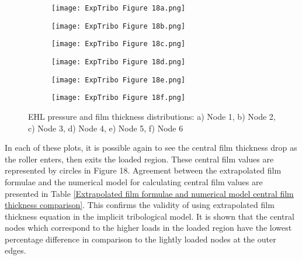 \begin{figure}
	\centering
	\begin{subfigure}[b]{0.49\textwidth}
		\centering
		\texttt{[image: ExpTribo Figure 18a.png]}
		\caption{}
		\label{NodeA}
	\end{subfigure}
	\hfill
	\begin{subfigure}[b]{0.49\textwidth}
		\centering
		\texttt{[image: ExpTribo Figure 18b.png]}
		\caption{}
		\label{NodeB}
	\end{subfigure}
	\hfill
	\begin{subfigure}[b]{0.49\textwidth}
		\centering
		\texttt{[image: ExpTribo Figure 18c.png]}
		\caption{}
		\label{NodeC}
	\end{subfigure}
	\hfill
	\begin{subfigure}[b]{0.49\textwidth}
		\centering
		\texttt{[image: ExpTribo Figure 18d.png]}
		\caption{}
		\label{NodeD}
	\end{subfigure}
	\hfill
	\begin{subfigure}[b]{0.49\textwidth}
		\centering
		\texttt{[image: ExpTribo Figure 18e.png]}
		\caption{}
		\label{NodeE}
	\end{subfigure}
	\hfill
	\begin{subfigure}[b]{0.49\textwidth}
		\centering
		\texttt{[image: ExpTribo Figure 18f.png]}
		\caption{}
		\label{NodeF}
	\end{subfigure}
	\caption{EHL pressure and film thickness distributions: a) Node 1, b) Node 2, c) Node 3, d) Node 4, e) Node 5, f) Node 6}
	\label{EHL pressure and film thickness distributions}
\end{figure}

In each of these plots, it is possible again to see the central film thickness drop as the roller enters, then exits the loaded region. These central film values are represented by circles in Figure 18. Agreement between the extrapolated film formulae and the numerical model for calculating central film values are presented in Table \ref{Extrapolated film formulae and numerical model central film thickness comparison}. This confirms the validity of using extrapolated film thickness equation in the implicit tribological model. It is shown that the central nodes which correspond to the higher loads in the loaded region have the lowest percentage difference in comparison to the lightly loaded nodes at the outer edges.

